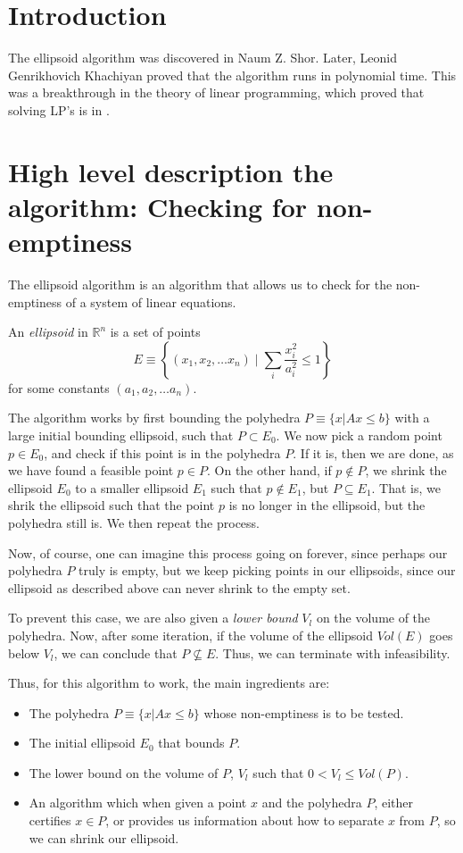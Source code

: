 \documentclass[conference]{IEEEtran}
\begin{document}
\section{Introduction}
The ellipsoid algorithm was discovered in Naum Z. Shor. Later, 
Leonid Genrikhovich Khachiyan proved that the algorithm runs in polynomial
time. This was a breakthrough in the theory of linear programming, which
proved that solving LP's is in \PTIME.

\section{High level description the algorithm: Checking for non-emptiness}
The ellipsoid algorithm is an algorithm that allows us to check for the
non-emptiness of a system of linear equations. 


An \textit{ellipsoid} in $\mathbb{R}^n$ is a set of points
\[E \equiv \left\{ (x_1, x_2, \dots x_n) \mid \sum_i \frac{x_i^2}{a_i^2} \leq 1 \right\}\] for some
constants $(a_1, a_2, \dots a_n)$. 

The algorithm works by first bounding the polyhedra $P \equiv \{ x | Ax \leq b \}$ 
with a large initial bounding ellipsoid, such that $P \subset E_0$. We now pick a
random point $p \in E_0$, and check if this point is in the polyhedra $P$. If it
is, then we are done, as we have found a feasible point $p \in P$. On the
other hand, if $p \notin P$, we shrink the ellipsoid $E_0$ to a smaller
ellipsoid $E_1$ such that $p \notin E_1$, but $P \subseteq E_1$. That is,
we shrik the ellipsoid such that the point $p$ is no longer in the ellipsoid,
but the polyhedra still is. We then repeat the process.

Now, of course, one can imagine this process going on forever, since perhaps
our polyhedra $P$ truly is empty, but we keep picking points in our ellipsoids,
since our ellipsoid as described above can never shrink to the empty set.

To prevent this case, we are also given a \textit{lower bound} $V_l$ on the volume
of the polyhedra. Now, after some iteration, if the volume of the ellipsoid $Vol(E)$
goes below $V_l$, we can conclude that $P \not\subseteq E$. Thus, we can
terminate with infeasibility.

Thus, for this algorithm to work, the main ingredients are:
\begin{itemize}
\item The polyhedra $P \equiv \{ x | Ax \leq b \}$ whose non-emptiness
                is to be tested.
\item The initial ellipsoid $E_0$ that bounds $P$.
\item The lower bound on the volume of $P$, $V_l$ such that $0 < V_l \leq
        Vol(P)$. 
\item An algorithm which when given a point $x$ and the polyhedra $P$, either
        certifies $x \in P$, or provides us information about how to separate
                $x$ from $P$, so we can shrink our ellipsoid.
\end{itemize}
\end{document}
